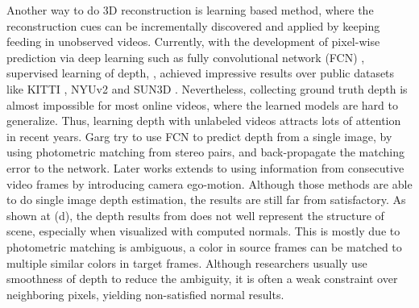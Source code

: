 Another way to do 3D reconstruction is learning based method, where the reconstruction cues can be incrementally discovered and applied by keeping feeding in unobserved videos. Currently, with the development of pixel-wise prediction via deep learning such as fully convolutional network (FCN) \cite{long2015fully}, supervised learning of depth, \eg \cite{eigen2014depth,ummenhofer2016demon}, achieved impressive results over public datasets like KITTI \cite{}, NYUv2 \cite{silberman2012indoor} and SUN3D \cite{xiao2013sun3d}. 
Nevertheless, collecting ground truth depth is almost impossible for most online videos, where the learned models are hard to generalize. 
Thus, learning depth with unlabeled videos attracts lots of attention in recent years.
Garg \etal \cite{godard2016unsupervised} try to use FCN to predict depth from a single image, by using photometric matching from stereo pairs, and back-propagate the matching error to the network. Later works \cite{zhou2017unsupervised,Vijayanarasimhan17} extends to using information from consecutive video frames by introducing camera ego-motion. 
Although those methods are able to do single image depth estimation, the results are still far from satisfactory. As shown at (d), the depth results from \cite{zhou2017unsupervised} does not well represent the structure of scene, especially when visualized with computed normals. 
This is mostly due to photometric matching is ambiguous, \ie a color in source frames can be matched to multiple similar colors in target frames. Although researchers usually use smoothness of depth \cite{zhou2017unsupervised} to reduce the ambiguity, it is often a weak constraint over neighboring pixels, yielding non-satisfied normal results.


